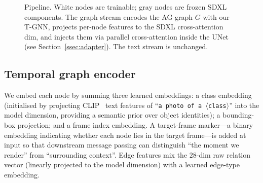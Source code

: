 \documentclass[11pt]{article}
\begin{document}
\begin{figure}[!h]
\centering
{}
\caption{Pipeline. White nodes are trainable; gray nodes are frozen
SDXL components. The graph stream encodes the AG graph $G$ with our
T-GNN, projects per-node features to the SDXL cross-attention dim,
and injects them via parallel cross-attention inside the UNet (see
Section~\ref{ssec:adapter}). The text stream is unchanged.}
\label{fig:pipeline}
\end{figure}

\subsection{Temporal graph encoder}
We embed each node by summing three learned embeddings: a
class embedding (initialised by projecting CLIP~\cite{radford2021clip} text features of
``\texttt{a photo of a $\langle$class$\rangle$}'' into the model
dimension, providing a semantic prior over object identities); a
bounding-box projection; and a frame index embedding. A target-frame
marker---a binary embedding indicating whether each node lies in the
target frame---is added at input so that downstream message passing can
distinguish ``the moment we render'' from ``surrounding context''.
Edge features mix the $28$-dim raw relation vector (linearly projected
to the model dimension) with a learned edge-type embedding.
\end{document}
